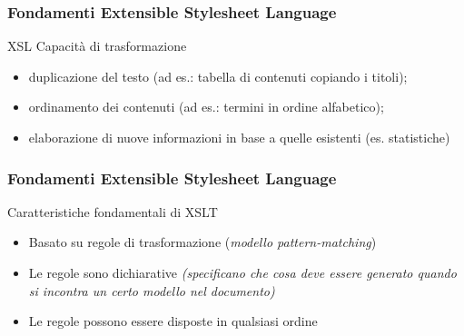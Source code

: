 \begin{frame}
    \frametitle{Fondamenti Extensible Stylesheet Language}
    \addtocounter{nframe}{1}
    

     \begin{block}{XSL Capacità di trasformazione}
         \begin{itemize}
            \item duplicazione del testo (ad es.: tabella di contenuti copiando i titoli);
            \item ordinamento dei contenuti (ad es.: termini in ordine alfabetico);
            \item elaborazione di nuove informazioni in base a quelle esistenti (es. statistiche)
        \end{itemize}
     \end{block}
    
\end{frame}

\begin{frame}
    \frametitle{Fondamenti Extensible Stylesheet Language}
    \addtocounter{nframe}{1}
    

     \begin{block}{Caratteristiche fondamentali di XSLT}
         \begin{itemize}
            \item Basato su regole di trasformazione (\textit{modello pattern-matching})
            \item Le regole sono dichiarative \textit{(specificano che cosa deve essere generato quando si incontra un certo modello nel documento)}
            \item Le regole possono essere disposte in qualsiasi ordine
        \end{itemize}
     \end{block}
    
\end{frame}


